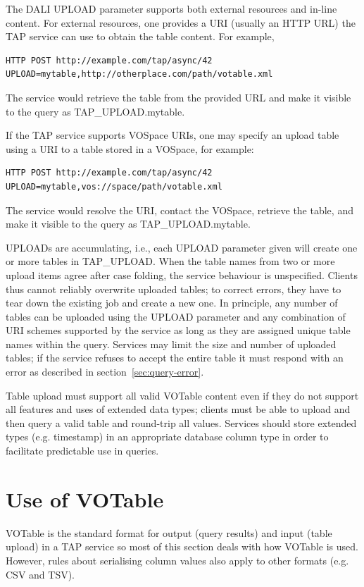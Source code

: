 \documentclass[11pt,letter]{ivoa}
\newcommand{\tapupload}{TAP\_UPLOAD}
\newcommand{\tapupload}{%
  {\relsize{-0.5}TAP\discretionary{-}{}{\kern-2pt\_}UPLOAD}}
\begin{document}
The DALI UPLOAD parameter supports both external resources and 
in-line 
content. For external resources, one provides a URI (usually an HTTP URL) the 
TAP service can use to obtain the table content. For example,
\begin{verbatim}
HTTP POST http://example.com/tap/async/42
UPLOAD=mytable,http://otherplace.com/path/votable.xml
\end{verbatim}
The service would retrieve the table from the provided URL and 
make it visible to the query as \tapupload.mytable.

If the TAP service supports VOSpace URIs, one may 
specify an upload table using a URI to a table stored in a VOSpace, for example:
\begin{verbatim}
HTTP POST http://example.com/tap/async/42
UPLOAD=mytable,vos://space/path/votable.xml
\end{verbatim}
The service would resolve the URI, contact the VOSpace, retrieve the table, and 
make it visible to the query as \tapupload.mytable.

UPLOADs are accumulating, i.e., each UPLOAD parameter given will create one or 
more tables in \tapupload. When the table names from two or more 
upload items agree after case folding, the service behaviour is unspecified. 
Clients thus cannot reliably overwrite uploaded tables; to correct errors, they 
have to tear down the existing job and create a new one. In principle, any 
number of tables can be uploaded using the UPLOAD parameter and any combination 
of URI schemes supported by the service as long as they are assigned unique 
table names within the query. Services may limit the size and number of 
uploaded tables; if the service refuses to accept the entire table it must 
respond with an error as described in section~\ref{sec:query-error}.

Table upload must support all valid VOTable content even if they do not support 
all features and uses of extended data types; clients must be able to upload and then
query a valid table and round-trip all values. Services should store extended types (e.g. 
timestamp) in an appropriate database column type in order to facilitate predictable use 
in queries.

\section{Use of VOTable}
\label{sec:votable}

VOTable \citep{std:VOTable} is the standard format for output (query 
results) and input (table upload) in a TAP service so most of this section 
deals with how VOTable is used. However, rules about serialising column values 
also apply to other formats (e.g. CSV and TSV).
\end{document}
